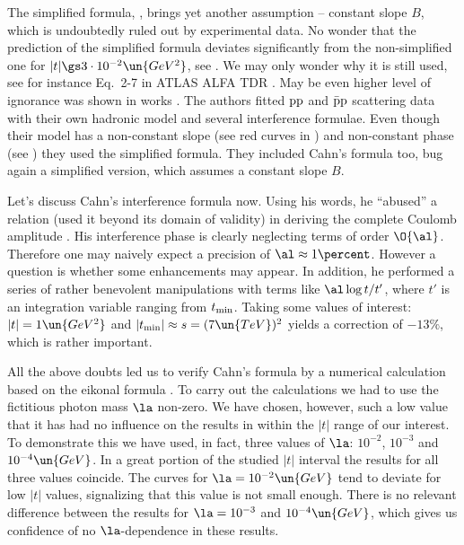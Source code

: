 The simplified \WaY{} formula, , brings yet another assumption -- constant slope $B$, which is undoubtedly ruled out by experimental data. No wonder that the prediction of the simplified formula deviates significantly from the non-simplified one for $|t| \gs 3\cdot 10^{-2}\un{GeV^2}$, see . We may only wonder why it is still used, see for instance Eq.~2-7 in ATLAS ALFA TDR . May be even higher level of ignorance was shown in works . The authors fitted $\rm pp$ and $\rm\bar pp$ scattering data with their own hadronic model and several interference formulae. Even though their model has a non-constant slope (see red curves in ) and non-constant phase (see ) they used the simplified \WY{} formula. They included Cahn's formula too, bug again a simplified version, which assumes a constant slope $B$.

Let's discuss Cahn's interference formula  now. Using his words, he ``abused'' a relation (used it beyond its domain of validity) in deriving the complete Coulomb amplitude . His interference phase is clearly neglecting terms of order $\O{\al}$. Therefore one may naively expect a precision of $\al\approx 1\percent$. However a question is whether some enhancements may appear. In addition, he performed a series of rather benevolent manipulations with terms like $\al \log t/ t'$, where $t'$ is an integration variable ranging from $t_{\rm min}$. Taking some values of interest: $|t| = 1\un{GeV^2}$ and $|t_{\rm min}| \approx s = (7\un{TeV})^2$ yields a correction of $-13\percent$, which is rather important.

All the above doubts led us to verify Cahn's formula by a numerical calculation based on the eikonal formula . To carry out the calculations we had to use the fictitious photon mass $\la$ non-zero. We have chosen, however, such a low value that it has had no influence on the results in within the $|t|$ range of our interest. To demonstrate this we have used, in fact, three values of $\la$: $10^{-2}$, $10^{-3}$ and $10^{-4}\un{GeV}$. In a great portion of the studied $|t|$ interval the results for all three values coincide. The curves for $\la = 10^{-2} \un{GeV}$ tend to deviate for low $|t|$ values, signalizing that this value is not small enough. There is no relevant difference between the results for $\la = 10^{-3}$ and $10^{-4}\un{GeV}$, which gives us confidence of no $\la$-dependence in these results.

